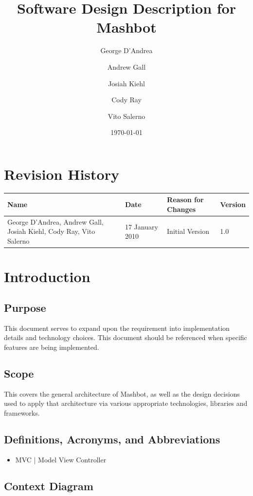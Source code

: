 \documentclass{article}
\begin{document}
\title{Software Design Description for Mashbot} 
\author{George D'Andrea \and Andrew Gall \and Josiah Kiehl \and
  Cody Ray \and Vito Salerno}
\date{\today}
\begin{titlepage}
\maketitle
\end{titlepage}

\section*{Revision History}
\begin{tabular}{|p{2in}|l|l|l|}
  \hline
  \textbf{Name} & \textbf{Date} & \textbf{Reason for Changes} & \textbf{Version} \\
  \hline \hline
  George D'Andrea, Andrew Gall, Josiah Kiehl, Cody Ray, Vito
  Salerno & 17 January 2010 & Initial Version & 1.0 \\
  \hline
\end{tabular}

\clearpage
\tableofcontents
\clearpage

\section{Introduction}
\subsection{Purpose}
This document serves to expand upon the requirement into implementation details and technology choices.  This document should be referenced when specific features are being implemented.
\subsection{Scope}
This covers the general architecture of Mashbot, as well as the design decisions used to apply that architecture via various appropriate technologies, libraries and frameworks.
\subsection{Definitions, Acronyms,   and Abbreviations}
\begin{itemize}
\item MVC | Model View Controller
\end{itemize}
\subsection{Context Diagram}
\end{document}
